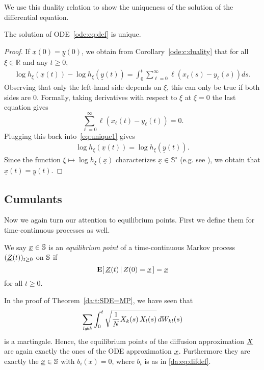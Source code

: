 \noindent
We use this duality relation to show the uniqueness of
the solution of the differential equation.

\begin{Theorem} \label{ode:t:ode_uniqueness}
The solution of ODE~\eqref{ode:eq:def} is unique.
\end{Theorem}

\begin{proof}
If $\underline x(0) = \underline y(0)$, we obtain from
Corollary~\ref{ode:c:duality} that for all $\xi\in\mathbb R$ and any $t\geq
0$,
\begin{align}
  \label{eq:unique1}
  \log h_{\xi}(\underline x(t)) - \log h_{\xi}(\underline y(t)) =
  \int_0^t \sum_{\ell =0}^\infty \ell (x_\ell (s) - y_\ell (s)) ds.
\end{align}
Observing that only the left-hand side depends on $\xi$, this can only
be true if both sides are 0. Formally, taking derivatives with respect
to $\xi$ at $\xi=0$ the last equation gives
$$ \sum_{\ell =0}^\infty \ell (x_\ell (t) - y_\ell (t)) = 0.$$
Plugging this back into~\eqref{eq:unique1} gives
\begin{align}
  \label{eq:unique2}
  \log h_{\xi}(\underline x(t)) = \log h_{\xi}(\underline y(t)).
\end{align}
Since the function $\xi\mapsto \log h_\xi(\underline x)$ characterizes $\underline x \in \mathbb
S^\circ$ (e.g. see \cite{etheridge_how_2008}), we obtain that $\underline x(t) = \underline y(t)$.
\end{proof}

\subsection{Cumulants}
\label{ode:sec:cumulants}
Now we again turn our attention to equilibrium points. First we define
them for time-continuous processes as well. 

\begin{Definition}
We say $\underline{x} \in \mathbb{S}$ is an \emph{equilibrium point} of a
time-continuous Markov process $(\underline{Z}(t))_{t \geq 0}$ on $\mathbb{S}$ if
$$ \mathbf{E} \! \left[  \, \underline{Z}(t) \, | \, Z(0) = \underline{x} \,   \right] = \underline{x} $$
for all $t \geq 0$. 
\end{Definition}

\noindent
In the proof of Theorem~\ref{da:t:SDE=MP}, we have seen that 
$$ \sum_{l \not= k} \int_0^t \sqrt{\frac{1}{N} X_{k} \! \left( s \right) X_{l} \! \left( s \right) }
  \, dW_{kl}(s) 
$$
is a martingale. Hence, the equilibrium points of the diffusion
approximation $\underline{X}$ are again exactly the ones of the ODE approximation
$\underline{x}$. Furthermore they are exactly the $\underline{x} \in \mathbb{S}$ with
$b_i(x) = 0$, where $b_i$ is as in \eqref{da:eq:difdef}.


